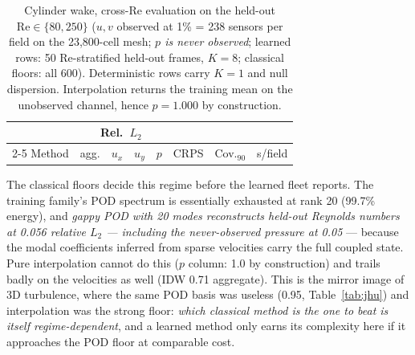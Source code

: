 \documentclass[aip,pof,reprint,amsmath,amssymb,superscriptaddress]{revtex4-1}
\begin{document}
\begin{table}[tbp]
\caption{\label{tab:cyl}Cylinder wake, cross-$\mathrm{Re}$ evaluation on the
held-out $\mathrm{Re}\in\{80,250\}$ ($u,v$ observed at 1\% = 238 sensors per
field on the 23{,}800-cell mesh; \emph{$p$ is never observed}; learned rows:
50 Re-stratified held-out frames, $K{=}8$; classical floors: all 600).
Deterministic rows carry $K{=}1$ and null dispersion. Interpolation returns
the training mean on the unobserved channel, hence $p{=}1.000$ by
construction.}
\footnotesize
\begin{ruledtabular}
\begin{tabular}{lccccccc}
 & \multicolumn{4}{c}{Rel.\ $L_2$} & & & \\
\cline{2-5}
Method & agg. & $u_x$ & $u_y$ & $p$ & CRPS & Cov.$_{90}$ & s/field \\
\hline

\end{tabular}
\end{ruledtabular}
\end{table}

The classical floors decide this regime before the learned fleet reports.
The training family's POD spectrum is essentially exhausted at rank 20
(99.7\% energy), and \emph{gappy POD with 20 modes reconstructs held-out
Reynolds numbers at 0.056 relative $L_2$ --- including the never-observed
pressure at 0.05} --- because the modal coefficients inferred from sparse
velocities carry the full coupled state. Pure interpolation cannot do this
($p$ column: 1.0 by construction) and trails badly on the velocities as well
(IDW 0.71 aggregate). This is the mirror image of 3D turbulence, where the
same POD basis was useless (0.95, Table~\ref{tab:jhu}) and interpolation was
the strong floor: \emph{which classical method is the one to beat is itself
regime-dependent}, and a learned method only earns its complexity here if it
approaches the POD floor at comparable cost.
\end{document}
